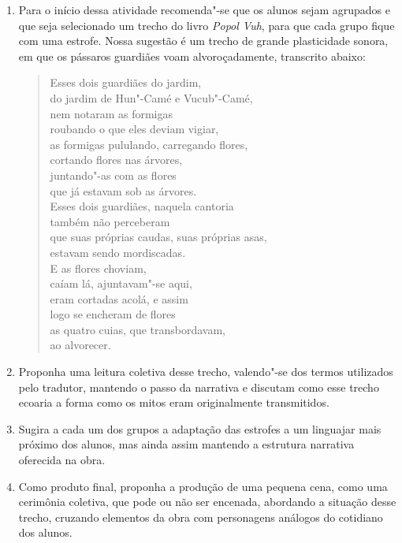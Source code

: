 \documentclass[12pt]{extarticle}
\begin{document}
\begin{enumerate}
\item
Para o início dessa atividade recomenda"-se que os alunos sejam agrupados e que
seja selecionado um trecho do livro \emph{Popol Vuh}, para que cada grupo fique 
com uma estrofe. Nossa sugestão é um trecho de grande plasticidade sonora, em que 
os pássaros guardiães voam alvoroçadamente, transcrito abaixo:

\begin{verse}
Esses dois guardiães do jardim,\\
do jardim de Hun"-Camé e Vucub"-Camé,\\
nem notaram as formigas\\
roubando o que eles deviam vigiar,\\
as formigas pululando, carregando flores,\\
cortando flores nas árvores,\\
juntando"-as com as flores\\
que já estavam sob as árvores.\\


Esses dois guardiães, naquela cantoria\\
também não perceberam\\
que suas próprias caudas, suas próprias asas,\\
estavam sendo mordiscadas.\\


E as flores choviam,\\
caíam lá, ajuntavam"-se aqui,\\
eram cortadas acolá, e assim\\
logo se encheram de flores\\
as quatro cuias, que transbordavam,\\
ao alvorecer.
\end{verse}

\item
Proponha uma leitura coletiva desse trecho, valendo"-se dos termos utilizados pelo 
tradutor, mantendo o passo da narrativa e discutam como esse trecho ecoaria a forma como 
os mitos eram originalmente transmitidos.

\item
Sugira a cada um dos grupos a adaptação das estrofes a um linguajar mais próximo dos alunos, mas
ainda assim mantendo a estrutura narrativa oferecida na obra.

\item
Como produto final, proponha a produção de uma pequena cena, como uma cerimônia coletiva, 
que pode ou não ser encenada, abordando a situação desse trecho, cruzando 
elementos da obra com personagens análogos do cotidiano dos alunos.

\end{enumerate}
\end{document}

